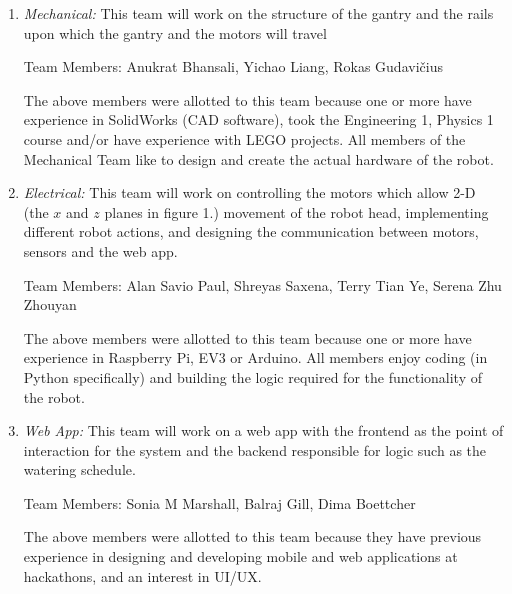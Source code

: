 \documentclass{article}
\begin{document}
\begin{enumerate}
    \itemsep0em
    \item \textit{Mechanical:} This team will work on the structure of the gantry and the rails upon which the gantry and the motors will travel \begin{center}
        Team Members: Anukrat Bhansali, Yichao Liang, Rokas Gudavi\v cius
    \end{center}
    The above members were allotted to this team because one or more have experience in SolidWorks (CAD software), took the Engineering 1, Physics 1 course and/or have experience with LEGO projects. All members of the Mechanical Team like to design and create the actual hardware of the robot.   
    \item \textit{Electrical:} This team will work on controlling the motors which allow 2-D (the $x$ and $z$ planes in figure 1.) movement of the robot head, implementing different robot actions, and designing the communication between motors, sensors and the web app.
    \begin{center}
        Team Members: Alan Savio Paul, Shreyas Saxena, Terry Tian Ye, Serena Zhu Zhouyan
    \end{center}
    The above members were allotted to this team because one or more have experience in Raspberry Pi, EV3 or Arduino. All members enjoy coding (in Python specifically) and building the logic required for the functionality of the robot.
    \item \textit{Web App:} This team will work on a web app with the frontend as the point of interaction for the system and the backend responsible for logic such as the watering schedule. \begin{center}
        Team Members: Sonia M Marshall, Balraj Gill, Dima Boettcher
    \end{center}
    The above members were allotted to this team because they have previous experience in designing and developing mobile and web applications at hackathons, and an interest in UI/UX.
\end{enumerate}
\end{document}
